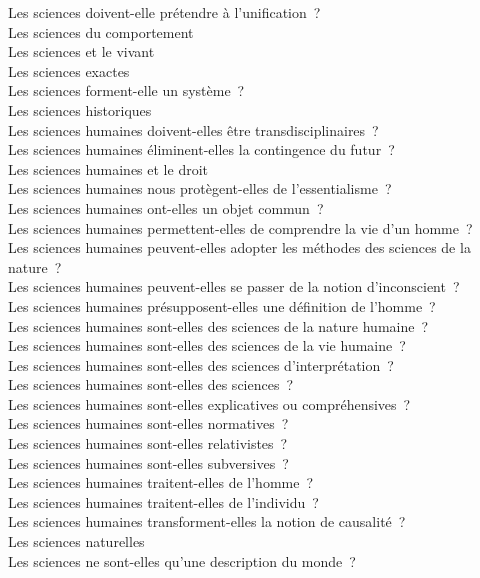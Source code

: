 \documentclass[a4paper,12pt]{article}
\begin{document}
Les sciences doivent-elle prétendre à l'unification ? \\
Les sciences du comportement \\
Les sciences et le vivant \\
Les sciences exactes \\
Les sciences forment-elle un système ? \\
Les sciences historiques \\
Les sciences humaines doivent-elles être transdisciplinaires ? \\
Les sciences humaines éliminent-elles la contingence du futur ? \\
Les sciences humaines et le droit \\
Les sciences humaines nous protègent-elles de l'essentialisme ? \\
Les sciences humaines ont-elles un objet commun ? \\
Les sciences humaines permettent-elles de comprendre la vie d'un homme ? \\
Les sciences humaines peuvent-elles adopter les méthodes des sciences de la nature ? \\
Les sciences humaines peuvent-elles se passer de la notion d'inconscient ? \\
Les sciences humaines présupposent-elles une définition de l'homme ? \\
Les sciences humaines sont-elles des sciences de la nature humaine ? \\
Les sciences humaines sont-elles des sciences de la vie humaine ? \\
Les sciences humaines sont-elles des sciences d'interprétation ? \\
Les sciences humaines sont-elles des sciences ? \\
Les sciences humaines sont-elles explicatives ou compréhensives ? \\
Les sciences humaines sont-elles normatives ? \\
Les sciences humaines sont-elles relativistes ? \\
Les sciences humaines sont-elles subversives ? \\
Les sciences humaines traitent-elles de l'homme ? \\
Les sciences humaines traitent-elles de l'individu ? \\
Les sciences humaines transforment-elles la notion de causalité ? \\
Les sciences naturelles \\
Les sciences ne sont-elles qu'une description du monde ? \\
\end{document}
